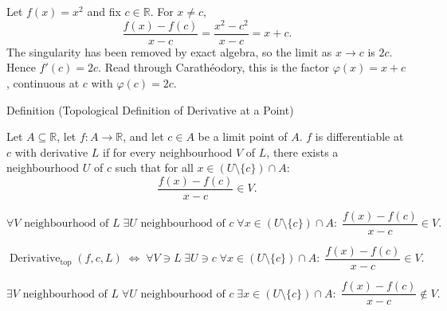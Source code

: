 \begin{exposition}
\label{ex:x2-derivative}
Let \(f(x)=x^2\) and fix \(c\in\mathbb{R}\). For \(x\neq c\),
\[
  \frac{f(x)-f(c)}{x-c}
  =
  \frac{x^2-c^2}{x-c}
  =
  x+c.
\]
The singularity has been removed by exact algebra, so the limit as
\(x\to c\) is \(2c\). Hence \(f'(c)=2c\). Read through
Carath\'{e}odory, this is the factor \(\varphi(x)=x+c\), continuous at
\(c\) with \(\varphi(c)=2c\).
\end{exposition}


\begin{definitionbox}{Definition (Topological Definition of Derivative at a Point)}
\begin{definition}
\label{def:topological-definition-of-derivative-at-a-point}
Let $A \subseteq \mathbb{R}$, let $f: A \to \mathbb{R}$, and let $c \in A$ be a limit point of $A$. $f$ is differentiable at $c$ with derivative $L$ if for every neighbourhood $V$ of $L$, there exists a neighbourhood $U$ of $c$ such that for all $x \in (U \setminus \{c\}) \cap A$:
\[
\frac{f(x) - f(c)}{x - c} \in V.
\]
\end{definition}
\end{definitionbox}

\begin{remark*}
\[
\forall V \text{ neighbourhood of } L\;\exists U \text{ neighbourhood of } c\;
\forall x \in (U \setminus \{c\}) \cap A:\;
\frac{f(x)-f(c)}{x-c} \in V.
\]
\end{remark*}

\begin{remark*}
\[
\operatorname{Derivative}_{\mathrm{top}}(f,c,L)
\;\Longleftrightarrow\;
\forall V \ni L\;\exists U \ni c\;\forall x \in (U\setminus\{c\})\cap A:\;
\frac{f(x)-f(c)}{x-c}\in V.
\]
\end{remark*}

\begin{remark*}
\[
\exists V \text{ neighbourhood of } L\;\forall U \text{ neighbourhood of } c\;
\exists x \in (U \setminus \{c\}) \cap A:\;
\frac{f(x)-f(c)}{x-c} \notin V.
\]
\end{remark*}


